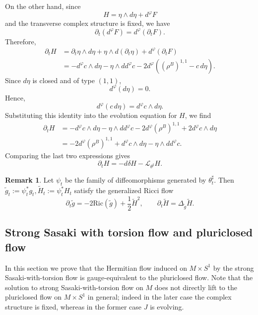\documentclass{article}
\makeatletter
\renewenvironment{proof}[1][\proofname]{%
  \par\pushQED{\qed}%
  \normalfont\topsep6\p@\@plus6\p@\relax
  \trivlist
  \item[\hskip\labelsep
        \textbf{\textup{#1}}\@addpunct{.}]\ignorespaces
}{%
  \popQED\endtrivlist\@endpefalse
}
\theoremstyle{definition}
\newtheorem{rmk}[thm]{Remark}
\renewcommand{\phi}{\varphi}
\numberwithin{equation}{section}
\makeatother
\begin{document}
\begin{proof}
On the other hand, since
\[
H=\eta\wedge d\eta+d^\phi F
\]
and the transverse complex structure is fixed, we have
\[
\partial_t(d^\phi F)
=
d^\phi(\partial_tF).
\]
Therefore,
\[
\begin{aligned}
\partial_tH
&=
\partial_t\eta\wedge d\eta
+\eta\wedge d(\partial_t\eta)
+d^\phi(\partial_tF)\\
&=
-d^\phi c\wedge d\eta
-\eta\wedge dd^\phi c
-2d^\phi\left(
(\rho^B)^{1,1}-c\,d\eta
\right).
\end{aligned}
\]
Since $d\eta$ is closed and of type $(1,1)$,
\[
d^\phi(d\eta)=0.
\]
Hence,
\[
d^\phi(c\,d\eta)
=
d^\phi c\wedge d\eta.
\]
Substituting this identity into the evolution equation for $H$, we find
\[
\begin{aligned}
\partial_tH
&=
-d^\phi c\wedge d\eta
-\eta\wedge dd^\phi c
-2d^\phi(\rho^B)^{1,1}+2d^\phi c\wedge d\eta\\
&=
-2d^\phi(\rho^B)^{1,1}
+d^\phi c\wedge d\eta
-\eta\wedge dd^\phi c.
\end{aligned}
\]
Comparing the last two expressions gives
\[
\partial_tH
=
-d\delta H-\mathcal L_{\theta^\sharp}H.
\]
\end{proof}



\begin{rmk}
Let $\psi_t$ be the family of diffeomorphisms generated by
$\theta_t^\sharp$. Then
$\widetilde g_t:=\psi_t^*g_t,
\widetilde H_t:=\psi_t^*H_t$
satisfy the generalized Ricci flow
\[
\partial_t\widetilde g
=
-2\mathrm{Ric}(\widetilde g)+\frac12\widetilde H^2,
\qquad
\partial_t\widetilde H
=
\Delta_{\widetilde g}\widetilde H.
\]
\end{rmk}
\subsection{Strong Sasaki with torsion flow and pluriclosed flow}

In this section we prove that the Hermitian flow induced on $M\times S^1$ by the strong Sasaki-with-torsion flow is gauge-equivalent to the pluriclosed flow. Note that the solution to strong Sasaki-with-torsion flow on $M$ does not directly lift to the pluriclosed flow on $M\times S^1$ in general; indeed in the later case the complex structure is fixed, whereas in the former case $J$ is evolving.
\end{document}

